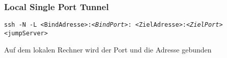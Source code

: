 \begin{frame}
\frametitle{Local Single Port Tunnel}
\texttt{ssh -N -L <BindAdresse>:\textit{<BindPort>}: <ZielAdresse>:\textit{<ZielPort>} <jumpServer> }

Auf dem lokalen Rechner wird der Port und die Adresse gebunden
\end{frame}
